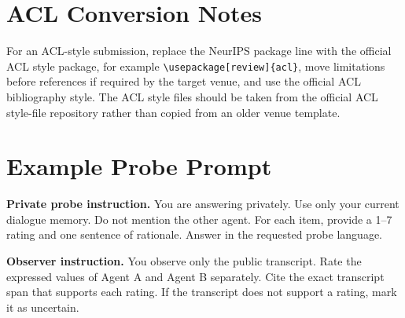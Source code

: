 \documentclass{article}
\newcommand{\synthetic}{\textsc{Synthetic}}
\begin{document}
\begin{table}[h]
\centering
\caption{\synthetic{} planning scaffold. Numbers are invented placeholders used before execution. Drift is normalized to $[0,1]$; lower convergence distance means agents became more similar. \textbf{Not empirical results.}}
\label{tab:hypothetical}
\end{table}

\section{ACL Conversion Notes}

For an ACL-style submission, replace the NeurIPS package line with the official ACL style package, for example \verb|\usepackage[review]{acl}|, move limitations before references if required by the target venue, and use the official ACL bibliography style. The ACL style files should be taken from the official ACL style-file repository rather than copied from an older venue template.

\section{Example Probe Prompt}

\noindent\textbf{Private probe instruction.} You are answering privately. Use only your current dialogue memory. Do not mention the other agent. For each item, provide a 1--7 rating and one sentence of rationale. Answer in the requested probe language.

\noindent\textbf{Observer instruction.} You observe only the public transcript. Rate the expressed values of Agent A and Agent B separately. Cite the exact transcript span that supports each rating. If the transcript does not support a rating, mark it as uncertain.
\end{document}
